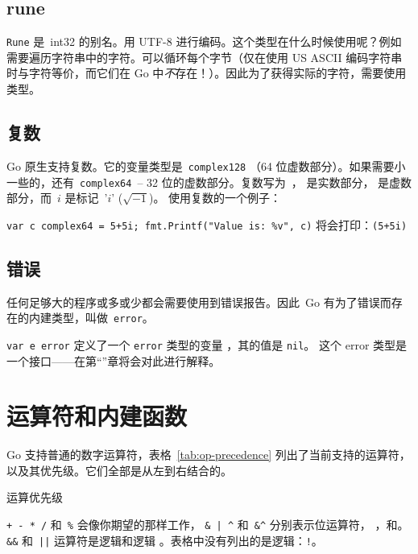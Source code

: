 \subsection{rune}
\lstinline{Rune} 是~int32 的别名。用 UTF-8 进行编码。这个类型在什么时候使用呢？例如需要遍历字符串中的字符。可以循环每个字节（仅在使用 US ASCII 编码字符串时与字符等价，而它们在 Go 中\emph{不}存在！）。因此为了获得实际的字符，需要使用  类型。

\subsection{复数}
Go 原生支持复数。它的变量类型是~\lstinline{complex128}
（64 位虚数部分）。如果需要小一些的，还有~\lstinline{complex64}~-- 
32 位的虚数部分。复数写为~， 是实数部分，
 是虚数部分，而~$i$ 是标记~'$i$' ($\sqrt{-1}$)。
使用复数的一个例子：

\lstinline{var c complex64 = 5+5i; fmt.Printf("Value is: %v", c)}\newline
将会打印：\lstinline{(5+5i)}

\subsection{错误}
任何足够大的程序或多或少都会需要使用到错误报告。因此~Go 有为了错误而存在的内建类型，叫做~\lstinline{error}。

\lstinline{var e error} 定义了一个 \lstinline{error} 类型的变量 ，其的值是 \lstinline{nil}。
这个 error 类型是一个接口——在第``''章将会对此进行解释。

\section{运算符和内建函数}
\label{sec:builtins}
Go 支持普通的数字运算符，表格~\ref{tab:op-precedence} 列出了当前支持的运算符，
以及其优先级。它们全部是从左到右结合的。

\begin{table}[H]
\begin{center}
\caption{运算优先级}
\label{tab:op-precedence}

\end{center}
\end{table}
\verb|+ - * /| 和~\verb|%| 会像你期望的那样工作，
\verb!& | ^! 和~\verb!&^! 分别表示位运算符，
，和。
\verb|&&| 和~\verb/||/ 运算符是逻辑和逻辑
。表格中没有列出的是逻辑：\verb/!/。

